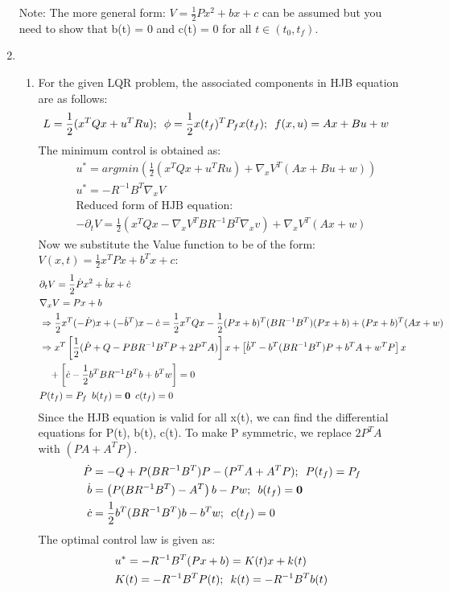 \begin{enumerate}
   Note: The more general form: $V = \frac{1}{2}Px^2 + bx + c$  can be assumed but you need to show that b(t) = 0 and c(t) = 0 for all $t\in(t_0,t_f)$.
  \item 
  \begin{enumerate}
   \item For the given LQR problem, the associated components in HJB equation are as follows:
  \begin{align*}
   &L = \frac{1}{2}(x^T Q x + u^T R u); \enskip \phi = \frac{1}{2}x(t_f)^T P_f x(t_f);\enskip f(x,u) = Ax+Bu+w
  \end{align*}
  The minimum control is obtained as:
  \begin{align*}
   &u^* = argmin ( \frac{1}{2} (x^T Q x + u^T R u ) + \nabla_x V^T (Ax+Bu+w))\\
   &u^* = -R^{-1}B^T\nabla_x V\\
   &\mbox{Reduced form of HJB equation: }\\
   &-\partial_t V = \frac{1}{2}(x^T Q x  - \nabla_x V^T B R^{-1} B^T \nabla_x v) + \nabla_x V^T (A x + w)
  \end{align*}
  Now we substitute the Value function to be of the form: $V(x,t) = \frac{1}{2} x^T P x + b^Tx + c$:
  \begin{align*}
   &\partial_t V = \frac{1}{2} \dot P x^2 + \dot b x + \dot c\\
   &\nabla_x V = Px + b\\
   &\Rightarrow \frac{1}{2}x^T(-\dot P)x + (-\dot b^T) x - \dot c = \frac{1}{2} x^T Q x - \frac{1}{2} (Px+b)^T (BR^{-1}B^T)(Px+b) + (Px+b)^T(Ax+w)\\
   &\Rightarrow x^T \left[ \frac{1}{2} (\dot P + Q - P B R^{-1} B^T P + 2P^T A)\right] x + \left[{\dot b}^T - b^T(BR^{-1}B^T)P+b^TA + w^TP\right]x \\
   & \quad + \left[\dot c - \frac{1}{2} b^T BR^{-1}B^T b + b^T w\right] = 0\\
   &P(t_f) = P_f \enskip b(t_f)= \mathbf{0} \enskip c(t_f) = 0
  \end{align*}
  Since the HJB equation is valid for all x(t), we can find the differential equations for P(t), b(t), c(t). To make P symmetric, we replace $2P^T A$ with $(PA + A^TP)$.
  \begin{align*}
   \dot P &= -Q + P(B R^{-1} B^T)P - (P^T A + A^T P); \enskip P(t_f) = P_f\\
   \dot b &= \left(P(BR^{-1}B^T) - A^T\right) b - Pw; \enskip b(t_f) = \mathbf{0}\\
   \dot c &= \frac{1}{2} b^T(B R^{-1} B^T) b - b^T w; \enskip c(t_f) = 0
  \end{align*}
  The optimal control law is given as:
  \begin{align*}
   &u^* = -R^{-1}B^T(Px+b) = K(t) x + k(t)\\
   &K(t) = -R^{-1}B^TP(t); \enskip k(t) = -R^{-1}B^Tb(t)
  \end{align*}


\end{enumerate}
\end{enumerate}
